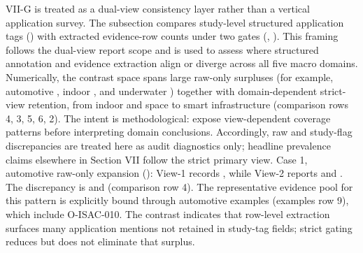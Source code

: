 {}VII-G is treated as a dual-view consistency layer rather than a vertical application survey. The subsection compares study-level structured application tags () with extracted evidence-row counts under two gates (, ). This framing follows the dual-view report scope and is used to assess where structured annotation and evidence extraction align or diverge across all five macro domains. Numerically, the contrast space spans large raw-only surpluses (for example, automotive , indoor , and underwater ) together with domain-dependent strict-view retention, from indoor  and space  to smart infrastructure  (comparison rows \markdownRendererHash{}4, \markdownRendererHash{}3, \markdownRendererHash{}5, \markdownRendererHash{}6, \markdownRendererHash{}2). The intent is methodological: expose view-dependent coverage patterns before interpreting domain conclusions. Accordingly, raw and study-flag discrepancies are treated here as audit diagnostics only; headline prevalence claims elsewhere in Section VII follow the strict primary view.\markdownRendererInterblockSeparator
{}
\markdownRendererSectionEnd \markdownRendererSectionBegin
{}\markdownRendererInterblockSeparator
{}Case 1, automotive raw-only expansion (): View-1 records , while View-2 reports  and . The discrepancy is  and  (comparison row \markdownRendererHash{}4). The representative evidence pool for this pattern is explicitly bound through automotive  examples (examples row \markdownRendererHash{}9), which include  O-ISAC-010. The contrast indicates that row-level extraction surfaces many application mentions not retained in study-tag fields; strict gating reduces but does not eliminate that surplus.\markdownRendererParagraphSeparator
